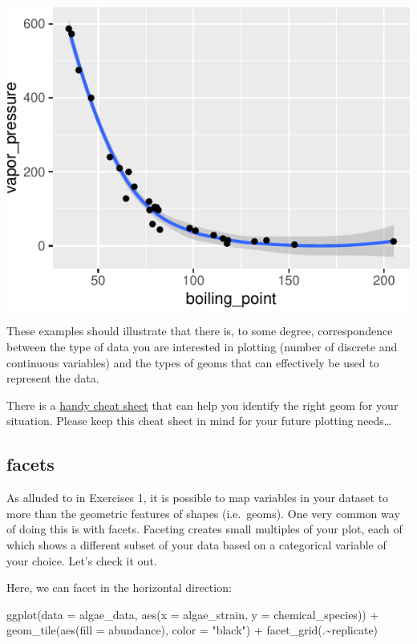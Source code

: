 \documentclass[
]{krantz}
\newenvironment{Shaded}{\begin{snugshade}}{\end{snugshade}}
\newcommand{\AttributeTok}[1]{\textcolor[rgb]{0.77,0.63,0.00}{#1}}
\newcommand{\FunctionTok}[1]{\textcolor[rgb]{0.00,0.00,0.00}{#1}}
\newcommand{\NormalTok}[1]{#1}
\newcommand{\SpecialCharTok}[1]{\textcolor[rgb]{0.00,0.00,0.00}{#1}}
\newcommand{\StringTok}[1]{\textcolor[rgb]{0.31,0.60,0.02}{#1}}
\begin{document}
\begin{center}\includegraphics{index_files/figure-latex/unnamed-chunk-55-1} \end{center}

These examples should illustrate that there is, to some degree, correspondence between the type of data you are interested in plotting (number of discrete and continuous variables) and the types of geoms that can effectively be used to represent the data.

There is a \href{https://www.maths.usyd.edu.au/u/UG/SM/STAT3022/r/current/Misc/data-visualization-2.1.pdf}{handy cheat sheet} that can help you identify the right geom for your situation. Please keep this cheat sheet in mind for your future plotting needs\ldots{}

\hypertarget{facets}{%
\subsection{facets}\label{facets}}

As alluded to in Exercises 1, it is possible to map variables in your dataset to more than the geometric features of shapes (i.e.~geoms). One very common way of doing this is with facets. Faceting creates small multiples of your plot, each of which shows a different subset of your data based on a categorical variable of your choice. Let's check it out.

Here, we can facet in the horizontal direction:

\begin{Shaded}
\begin{Highlighting}[]
\FunctionTok{ggplot}\NormalTok{(}\AttributeTok{data =}\NormalTok{ algae\_data, }\FunctionTok{aes}\NormalTok{(}\AttributeTok{x =}\NormalTok{ algae\_strain, }\AttributeTok{y =}\NormalTok{ chemical\_species)) }\SpecialCharTok{+} 
  \FunctionTok{geom\_tile}\NormalTok{(}\FunctionTok{aes}\NormalTok{(}\AttributeTok{fill =}\NormalTok{ abundance), }\AttributeTok{color =} \StringTok{"black"}\NormalTok{) }\SpecialCharTok{+} 
  \FunctionTok{facet\_grid}\NormalTok{(.}\SpecialCharTok{\textasciitilde{}}\NormalTok{replicate)}
\end{Highlighting}
\end{Shaded}
\end{document}
